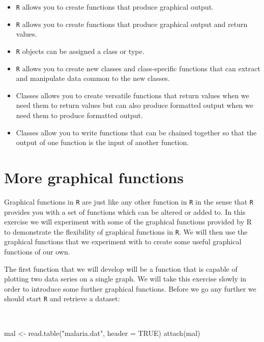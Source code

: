 \documentclass[
  12pt,
  a4paper]{book}
\newenvironment{Shaded}{\begin{snugshade}}{\end{snugshade}}
\newcommand{\AttributeTok}[1]{\textcolor[rgb]{0.77,0.63,0.00}{#1}}
\newcommand{\ConstantTok}[1]{\textcolor[rgb]{0.00,0.00,0.00}{#1}}
\newcommand{\FunctionTok}[1]{\textcolor[rgb]{0.00,0.00,0.00}{#1}}
\newcommand{\NormalTok}[1]{#1}
\newcommand{\OtherTok}[1]{\textcolor[rgb]{0.56,0.35,0.01}{#1}}
\newcommand{\StringTok}[1]{\textcolor[rgb]{0.31,0.60,0.02}{#1}}
\begin{document}
\begin{itemize}
\item
  \texttt{R} allows you to create functions that produce graphical output.
\item
  \texttt{R} allows you to create functions that produce graphical output and return values.
\item
  \texttt{R} objects can be assigned a class or type.
\item
  \texttt{R} allows you to create new classes and class-specific functions that can extract and manipulate data common to the new classes.
\item
  Classes allows you to create versatile functions that return values when we need them to return values but can also produce formatted output when we need them to produce formatted output.
\item
  Classes allow you to write functions that can be chained together so that the output of one function is the input of another function.
\end{itemize}

\hypertarget{exercise8}{%
\chapter{More graphical functions}\label{exercise8}}

Graphical functions in \texttt{R} are just like any other function in \texttt{R} in the sense that \texttt{R} provides you with a set of functions which can be altered or added to. In this exercise we will experiment with some of the graphical functions provided by R to demonstrate the flexibility of graphical functions in \texttt{R}. We will then use the graphical functions that we experiment with to create some useful graphical functions of our own.

The first function that we will develop will be a function that is capable of plotting two data series on a single graph. We will take this exercise slowly in order to introduce some further graphical functions.
Before we go any further we should start \texttt{R} and retrieve a dataset:

~

\begin{Shaded}
\begin{Highlighting}[]
\NormalTok{mal }\OtherTok{\textless{}{-}} \FunctionTok{read.table}\NormalTok{(}\StringTok{"malaria.dat"}\NormalTok{, }\AttributeTok{header =} \ConstantTok{TRUE}\NormalTok{)}
\FunctionTok{attach}\NormalTok{(mal)}
\end{Highlighting}
\end{Shaded}
\end{document}
